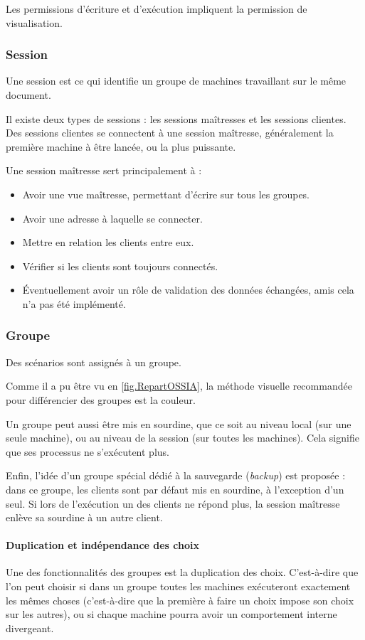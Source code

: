 Les permissions d'écriture et d'exécution impliquent la permission de visualisation.

\subsubsection{Session}
Une session est ce qui identifie un groupe de machines travaillant sur le même document.

Il existe deux types de sessions : les sessions maîtresses et les sessions clientes.
Des sessions clientes se connectent à une session maîtresse, généralement la première machine à être lancée, ou la plus puissante.

Une session maîtresse sert principalement à : 
\begin{itemize}
	\item Avoir une vue maîtresse, permettant d'écrire sur tous les groupes.
	\item Avoir une adresse à laquelle se connecter.
	\item Mettre en relation les clients entre eux.
	\item Vérifier si les clients sont toujours connectés.
	\item Éventuellement avoir un rôle de validation des données échangées, amis cela n'a pas été implémenté.
\end{itemize}

\subsubsection{Groupe}
Des scénarios sont assignés à un groupe.

Comme il a pu être vu en \cref{fig.RepartOSSIA}, la méthode visuelle recommandée pour différencier des groupes est la couleur.

Un groupe peut aussi être mis en sourdine, que ce soit au niveau local (sur une seule machine), ou au niveau de la session (sur toutes les machines). Cela signifie que ses processus ne s'exécutent plus.

Enfin, l'idée d'un groupe spécial dédié à la sauvegarde (\textit{backup}) est proposée : dans ce groupe, les clients sont par défaut mis en sourdine, à l'exception d'un seul. Si lors de l'exécution un des clients ne répond plus, la session maîtresse enlève sa sourdine à un autre client.

\paragraph{Duplication et indépendance des choix}
Une des fonctionnalités des groupes est la duplication des choix. C'est-à-dire que l'on peut choisir si dans un groupe toutes les machines exécuteront exactement les mêmes choses (c'est-à-dire que la première à faire un choix impose son choix sur les autres), ou si chaque machine pourra avoir un comportement interne divergeant.

